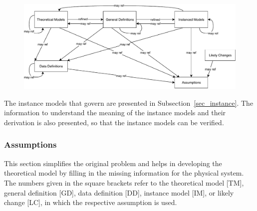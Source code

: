 \documentclass[12pt]{article}
\begin{document}
\begin{figure}[H]
  \includegraphics[scale=0.9]{RelationsBetweenTM_GD_IM_DD_A.pdf}
\end{figure}

The instance models that govern \progname{} are presented in
Subsection~\ref{sec_instance}.  The information to understand the meaning of the
instance models and their derivation is also presented, so that the instance
models can be verified.

\subsubsection{Assumptions} \label{sec_assumpt}


This section simplifies the original problem and helps in developing the
theoretical model by filling in the missing information for the physical system.
The numbers given in the square brackets refer to the theoretical model [TM],
general definition [GD], data definition [DD], instance model [IM], or likely
change [LC], in which the respective assumption is used.
\end{document}
